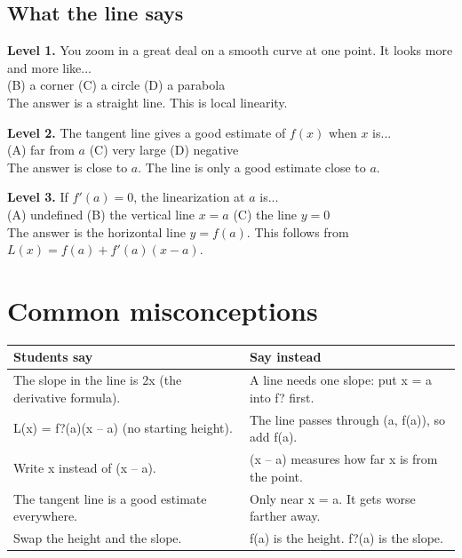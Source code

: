 \documentclass[11pt]{article}
\begin{document}
\subsection*{What the line says}
\noindent\textbf{Level 1.} You zoom in a great deal on a smooth curve at one point. It looks more and more like...\\  \quad (B) a corner \quad (C) a circle \quad (D) a parabola\\  \quad The answer is a straight line. This is local linearity.\par\medskip
\noindent\textbf{Level 2.} The tangent line gives a good estimate of $f(x)$ when $x$ is...\\ (A) far from $a$ \quad {} \quad (C) very large \quad (D) negative\\  \quad The answer is close to $a$. The line is only a good estimate close to $a$.\par\medskip
\noindent\textbf{Level 3.} If $f'(a)=0$, the linearization at $a$ is...\\ (A) undefined \quad (B) the vertical line $x=a$ \quad (C) the line $y=0$ \quad {}\\  \quad The answer is the horizontal line $y=f(a)$. This follows from $L(x)=f(a)+f'(a)(x-a)$.\par\medskip
\section*{Common misconceptions}\begin{tabularx}{\textwidth}{@{}X X@{}}\toprule Students say & Say instead\\\midrule
The slope in the line is 2x (the derivative formula). & A line needs one slope: put x = a into f? first.\\
L(x) = f?(a)(x -- a) (no starting height). & The line passes through (a, f(a)), so add f(a).\\
Write x instead of (x -- a). & (x -- a) measures how far x is from the point.\\
The tangent line is a good estimate everywhere. & Only near x = a. It gets worse farther away.\\
Swap the height and the slope. & f(a) is the height. f?(a) is the slope.\\
\bottomrule\end{tabularx}
\end{document}
